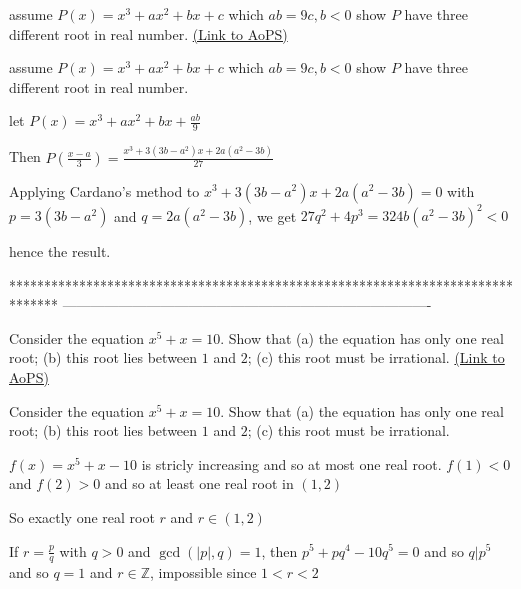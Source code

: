 \begin{problem}
	assume $ P(x)= x^3+ax^2+bx+c$ which $ ab=9c ,   b<0$ show $P$ have three different root in real number.
	\flushright \href{https://artofproblemsolving.com/community/c6h473926}{(Link to AoPS)}
\end{problem}



\begin{solution}
	\begin{tcolorbox}assume $ P(x)= x^3+ax^2+bx+c$ which $ ab=9c ,   b<0$ show $P$ have three different root in real number.\end{tcolorbox}
let $P(x)=x^3+ax^2+bx+\frac{ab}9$

Then $P(\frac {x-a}3)=\frac{x^3+3(3b-a^2)x+2a(a^2-3b)}{27}$

Applying Cardano's method to $x^3+3(3b-a^2)x+2a(a^2-3b)=0$ with $p=3(3b-a^2)$ and $q=2a(a^2-3b)$, we get $27q^2+4p^3=324b(a^2-3b)^2<0$

hence the result.
\end{solution}
*******************************************************************************
-------------------------------------------------------------------------------

\begin{problem}
	Consider the equation $x^5+x=10$. Show that
(a) the equation has only one real root;
(b) this root lies between $1$ and $2$;
(c) this root must be irrational.
	\flushright \href{https://artofproblemsolving.com/community/c6h475185}{(Link to AoPS)}
\end{problem}



\begin{solution}
	\begin{tcolorbox}Consider the equation $x^5+x=10$. Show that
(a) the equation has only one real root;
(b) this root lies between $1$ and $2$;
(c) this root must be irrational.\end{tcolorbox}
$f(x)=x^5+x-10$ is stricly increasing and so at most one real root.
$f(1)<0$ and $f(2)>0$ and so at least one real root in $(1,2)$

So exactly one real root $r$ and $r\in(1,2)$

If $r=\frac pq$ with $q>0$ and $\gcd(|p|,q)=1$, then $p^5+pq^4-10q^5=0$ and so $q|p^5$ and so $q=1$ and $r\in\mathbb Z$, impossible since $1<r<2$
\end{solution}



